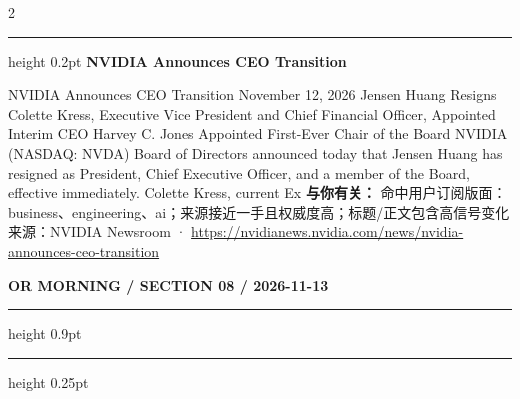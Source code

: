 \documentclass[10.5pt]{ctexart}
\begin{document}
\begin{multicols}{2}
\vspace{2mm}
\hrule height 0.2pt
\vspace{2mm}
{\large\bfseries NVIDIA Announces CEO Transition}\par
NVIDIA Announces CEO Transition November 12, 2026 Jensen Huang Resigns Colette Kress, Executive Vice President and Chief Financial Officer, Appointed Interim CEO Harvey C. Jones Appointed First-Ever Chair of the Board NVIDIA (NASDAQ: NVDA) Board of Directors announced today that Jensen Huang has resigned as President, Chief Executive Officer, and a member of the Board, effective immediately. Colette Kress, current Ex
\textbf{与你有关：} 命中用户订阅版面：business、engineering、ai；来源接近一手且权威度高；标题/正文包含高信号变化
{\footnotesize\color{ormuted} 来源：NVIDIA Newsroom · \url{https://nvidianews.nvidia.com/news/nvidia-announces-ceo-transition}}
\end{multicols}
\newpage
{\small\bfseries OR MORNING / SECTION 08 / 2026-11-13}
\vspace{2mm}
\hrule height 0.9pt
\vspace{1.5mm}
\hrule height 0.25pt
\vspace{4mm}
\end{document}
